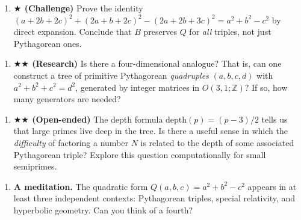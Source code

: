 \begin{enumerate}[leftmargin=*]
\item \textbf{$\bigstar$ (Challenge)} Prove the identity $(a + 2b + 2c)^2 + (2a + b + 2c)^2 - (2a + 2b + 3c)^2 = a^2 + b^2 - c^2$ by direct expansion. Conclude that $B$ preserves $Q$ for \textit{all} triples, not just Pythagorean ones.
\end{enumerate}

\begin{enumerate}[leftmargin=*]
\item \textbf{$\bigstar$$\bigstar$ (Research)} Is there a four-dimensional analogue? That is, can one construct a tree of primitive Pythagorean \textit{quadruples} $(a, b, c, d)$ with $a^2 + b^2 + c^2 = d^2$, generated by integer matrices in $O(3,1; \mathbb{Z})$? If so, how many generators are needed?
\end{enumerate}

\begin{enumerate}[leftmargin=*]
\item \textbf{$\bigstar$$\bigstar$ (Open-ended)} The depth formula $\text{depth}(p) = (p-3)/2$ tells us that large primes live deep in the tree. Is there a useful sense in which the \textit{difficulty} of factoring a number $N$ is related to the depth of some associated Pythagorean triple? Explore this question computationally for small semiprimes.
\end{enumerate}

\begin{enumerate}[leftmargin=*]
\item \textbf{A meditation.} The quadratic form $Q(a, b, c) = a^2 + b^2 - c^2$ appears in at least three independent contexts: Pythagorean triples, special relativity, and hyperbolic geometry. Can you think of a fourth?
\end{enumerate}

